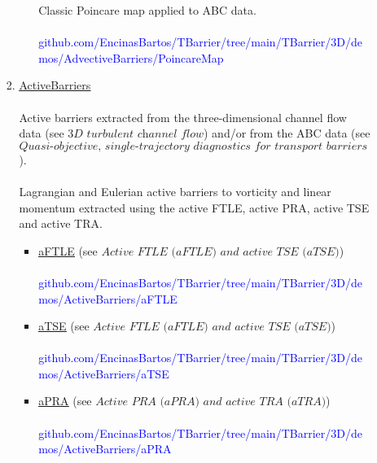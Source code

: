 \documentclass{article}
\begin{document}
\begin{enumerate}
\begin{enumerate}
\begin{enumerate}
\begin{itemize}
Classic Poincare map applied to ABC data.\\ \\
\textcolor{blue}{{\footnotesize github.com/EncinasBartos/TBarrier/tree/main/TBarrier/3D/demos/AdvectiveBarriers/PoincareMap}} \\ 
 \end{itemize}
 \item \href{https://github.com/EncinasBartos/TBarrier/tree/main/TBarrier/3D/demos/ActiveBarriers}{\underline{ActiveBarriers}} \\ \\
Active barriers extracted from the three-dimensional channel flow data (see $ \textit{3D turbulent channel flow} $) and/or from the ABC data \newline (see $ \textit{Quasi-objective, single-trajectory diagnostics for transport barriers} $). \\ \\ Lagrangian and Eulerian active barriers to vorticity and linear momentum  extracted using the active FTLE, active PRA, active TSE and active TRA. \\
 \begin{itemize}
  \item \href{https://github.com/EncinasBartos/TBarrier/tree/main/TBarrier/3D/demos/ActiveBarriers/aFTLE}{\underline{aFTLE}} (see $ \textit{Active FTLE (aFTLE) and active TSE (aTSE)} $) \\ \\
   \textcolor{blue}{{\footnotesize github.com/EncinasBartos/TBarrier/tree/main/TBarrier/3D/demos/ActiveBarriers/aFTLE}} \\
    \item \href{https://github.com/EncinasBartos/TBarrier/tree/main/TBarrier/3D/demos/ActiveBarriers/aTSE}{\underline{aTSE}} (see $ \textit{Active FTLE (aFTLE) and active TSE (aTSE)} $) \\ \\
      \textcolor{blue}{{\footnotesize github.com/EncinasBartos/TBarrier/tree/main/TBarrier/3D/demos/ActiveBarriers/aTSE}} \\ 
  \item \href{https://github.com/EncinasBartos/TBarrier/tree/main/TBarrier/3D/demos/ActiveBarriers/aPRA}{\underline{aPRA}} (see $ \textit{Active PRA (aPRA) and active TRA (aTRA)} $) \\ \\
    \textcolor{blue}{{\footnotesize github.com/EncinasBartos/TBarrier/tree/main/TBarrier/3D/demos/ActiveBarriers/aPRA}} \\

\end{itemize}
\end{enumerate}
\end{enumerate}
\end{enumerate}
\end{document}
